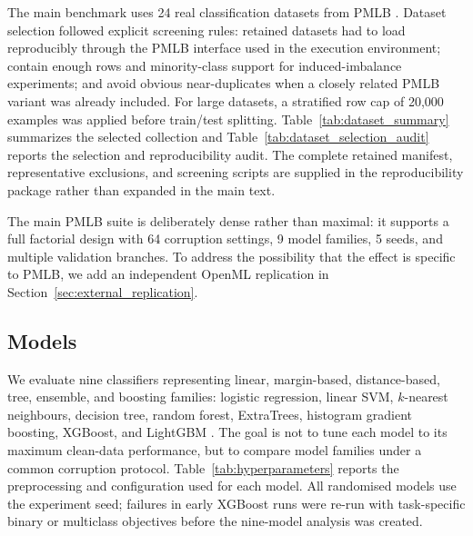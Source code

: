 \documentclass[preprint,12pt,number]{elsarticle}
\begin{document}
The main benchmark uses 24 real classification datasets from PMLB \citep{olson2017pmlb}. Dataset selection followed explicit screening rules: retained datasets had to load reproducibly through the PMLB interface used in the execution environment; contain enough rows and minority-class support for induced-imbalance experiments; and avoid obvious near-duplicates when a closely related PMLB variant was already included. For large datasets, a stratified row cap of 20,000 examples was applied before train/test splitting. Table~\ref{tab:dataset_summary} summarizes the selected collection and Table~\ref{tab:dataset_selection_audit} reports the selection and reproducibility audit. The complete retained manifest, representative exclusions, and screening scripts are supplied in the reproducibility package rather than expanded in the main text.




The main PMLB suite is deliberately dense rather than maximal: it supports a full factorial design with 64 corruption settings, 9 model families, 5 seeds, and multiple validation branches. To address the possibility that the effect is specific to PMLB, we add an independent OpenML replication in Section~\ref{sec:external_replication}.

\subsection{Models}

We evaluate nine classifiers representing linear, margin-based, distance-based, tree, ensemble, and boosting families: logistic regression, linear SVM, $k$-nearest neighbours, decision tree, random forest, ExtraTrees, histogram gradient boosting, XGBoost, and LightGBM \citep{pedregosa2011scikit,quinlan1986induction,cortes1995support,breiman2001random,chen2016xgboost,ke2017lightgbm}. The goal is not to tune each model to its maximum clean-data performance, but to compare model families under a common corruption protocol. Table~\ref{tab:hyperparameters} reports the preprocessing and configuration used for each model. All randomised models use the experiment seed; failures in early XGBoost runs were re-run with task-specific binary or multiclass objectives before the nine-model analysis was created.


\end{document}
